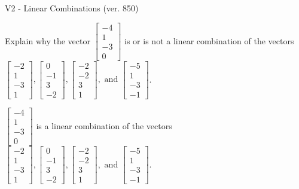 \begin{exercise}
  \begin{exerciseTitle}V2 - Linear Combinations (ver. 850)\end{exerciseTitle}
  \begin{exerciseStatement}
    Explain why the vector \(\left[\begin{array}{c}
-4 \\
1 \\
-3 \\
0
\end{array}\right]\)  is or is not a linear 
	combination of the vectors \(\left[\begin{array}{c}
-2 \\
1 \\
-3 \\
1
\end{array}\right] , \left[\begin{array}{c}
0 \\
-1 \\
3 \\
-2
\end{array}\right] , \left[\begin{array}{c}
-2 \\
-2 \\
3 \\
1
\end{array}\right] , \text{ and } \left[\begin{array}{c}
-5 \\
1 \\
-3 \\
-1
\end{array}\right]\).
	


  \end{exerciseStatement}
  \begin{exerciseAnswer}
   \(\left[\begin{array}{c}
-4 \\
1 \\
-3 \\
0
\end{array}\right]\) 
  	 is  
	a linear combination of the vectors \(\left[\begin{array}{c}
-2 \\
1 \\
-3 \\
1
\end{array}\right] , \left[\begin{array}{c}
0 \\
-1 \\
3 \\
-2
\end{array}\right] , \left[\begin{array}{c}
-2 \\
-2 \\
3 \\
1
\end{array}\right] , \text{ and } \left[\begin{array}{c}
-5 \\
1 \\
-3 \\
-1
\end{array}\right]\).


\end{exerciseAnswer}
\end{exercise}
